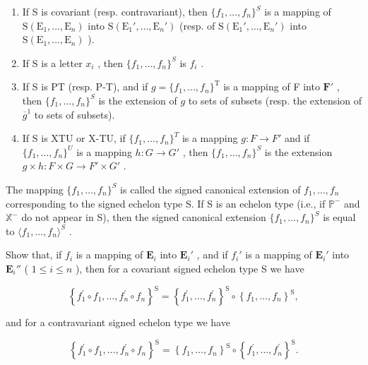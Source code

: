 \begin{enumerate}
\def\labelenumi{(\roman{enumi})}
\item
  If S is covariant (resp. contravariant), then \(\{f_1, \ldots, f_n\}^{S}\) is a mapping of \(\mathrm{S}(\mathrm{E}_1, \ldots, \mathrm{E}_n)\) into \(\mathrm{S}(\mathrm{E}_1', \ldots, \mathrm{E}_n')\) (resp. of \(\mathrm{S}(\mathrm{E}_1', \ldots, \mathrm{E}_n')\) into \(\mathrm{S}(\mathrm{E}_1, \ldots, \mathrm{E}_n)\) ).
\item
  If S is a letter \(x_{i}\) , then \(\{f_1, \ldots, f_n\}^{S}\) is \(f_{i}\) .
\item
  If S is PT (resp. P-T), and if \(g = \{f_1, \ldots, f_n\}^{\mathrm{T}}\) is a mapping of F into \(\mathbf{F}'\) , then \(\{f_1, \ldots, f_n\}^{S}\) is the extension of \(g\) to sets of subsets (resp. the extension of \(\overline{g}^1\) to sets of subsets).
\item
  If S is XTU or X-TU, if \(\{f_{1},\ldots,f_{n}\}^{T}\) is a mapping \(g:F\to F'\) and if \(\{f_{1},\ldots,f_{n}\}^{U}\) is a mapping \(h:G\to G'\) , then \(\{f_{1},\ldots,f_{n}\}^{S}\) is the extension \(g\times h:F\times G\to F'\times G'\) .
\end{enumerate}

The mapping \(\{f_1, \ldots, f_n\}^{S}\) is called the signed canonical extension of \(f_1, \ldots, f_n\) corresponding to the signed echelon type S. If S is an echelon type (i.e., if \(\mathbb{P}^{-}\) and \(\mathbb{X}^{-}\) do not appear in S), then the signed canonical extension \(\{f_1, \ldots, f_n\}^{S}\) is equal to \(\langle f_1, \ldots, f_n \rangle^{S}\) .

Show that, if \(f_{i}\) is a mapping of \(\mathbf{E}_i\) into \(\mathbf{E}_i'\) , and if \(f_{i}'\) is a mapping of \(\mathbf{E}_i'\) into \(\mathbf{E}_i''\) ( \(1 \leqslant i \leqslant n\) ), then for a covariant signed echelon type S we have

\[
\left\{f _ {1} ^ {\prime} \circ f _ {1}, \dots , f _ {n} ^ {\prime} \circ f _ {n} \right\} ^ {\mathrm{S}} = \left\{f _ {1} ^ {\prime}, \dots , f _ {n} ^ {\prime} \right\} ^ {\mathrm{S}} \circ \left\{f _ {1}, \dots , f _ {n} \right\} ^ {\mathrm{S}},
\]

and for a contravariant signed echelon type we have

\[
\left\{f _ {1} ^ {\prime} \circ f _ {1}, \dots , f _ {n} ^ {\prime} \circ f _ {n} \right\} ^ {\mathrm{S}} = \left\{f _ {1}, \dots , f _ {n} \right\} ^ {\mathrm{S}} \circ \left\{f _ {1} ^ {\prime}, \dots , f _ {n} ^ {\prime} \right\} ^ {\mathrm{S}}.
\]


